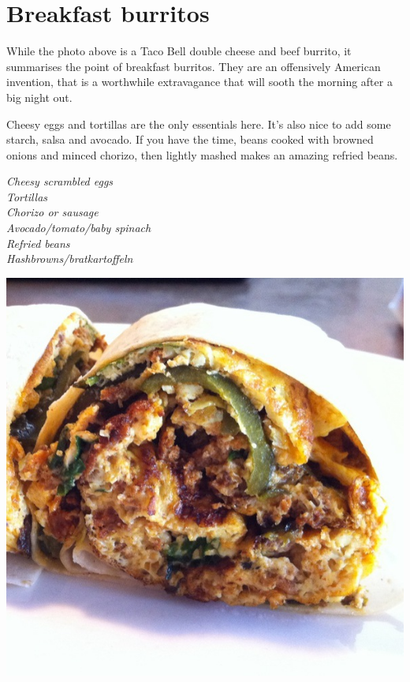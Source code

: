 \documentclass{tufte-book}
\begin{document}
\section{Breakfast burritos}

While the photo above is a Taco Bell double cheese and beef burrito, it summarises the point of breakfast burritos. They are an offensively American invention, that is a worthwhile extravagance that will sooth the morning after a big night out.

Cheesy eggs and tortillas are the only essentials here. It's also nice to add some starch, salsa and avocado. If you have the time, beans cooked with browned onions and minced chorizo, then lightly mashed makes an amazing refried beans.

\smallskip
\emph{Cheesy scrambled eggs
\\Tortillas
\\Chorizo or sausage
\\Avocado/tomato/baby spinach
\\Refried beans
\\Hashbrowns/bratkartoffeln
}

\begin{marginfigure}%
  \includegraphics[width=\linewidth]{burrito.jpg}
\end{marginfigure}
\end{document}
